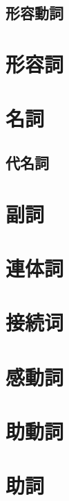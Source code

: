 \subsection{形容動詞}

\newpage

\section{形容詞}

\newpage

\section{名詞}

\newpage

\subsection{代名詞}

\newpage

\section{副詞}

\newpage

\section{連体詞}

\newpage

\section{接続词}

\newpage

\section{感動詞}

\newpage

\section{助動詞}

\newpage

\section{助詞}




\newpage